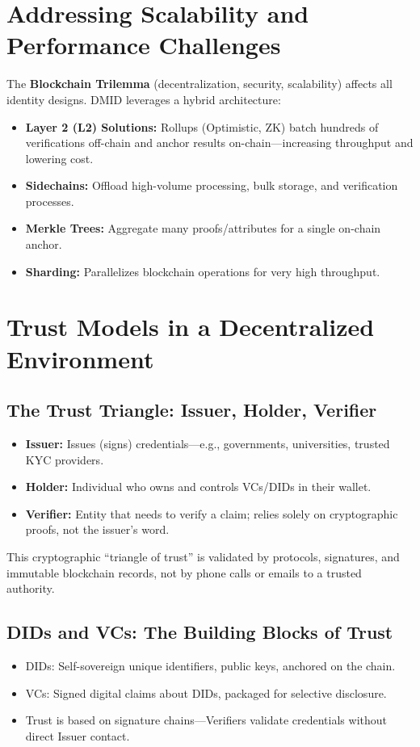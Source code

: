\section{Addressing Scalability and Performance Challenges}
The \textbf{Blockchain Trilemma} (decentralization, security, scalability) affects all identity designs. DMID leverages a hybrid architecture:
\begin{itemize}
    \item \textbf{Layer 2 (L2) Solutions:} Rollups (Optimistic, ZK) batch hundreds of verifications off-chain and anchor results on-chain—increasing throughput and lowering cost.
    \item \textbf{Sidechains:} Offload high-volume processing, bulk storage, and verification processes.
    \item \textbf{Merkle Trees:} Aggregate many proofs/attributes for a single on-chain anchor.
    \item \textbf{Sharding:} Parallelizes blockchain operations for very high throughput.
\end{itemize}

\section{Trust Models in a Decentralized Environment}

\subsection{The Trust Triangle: Issuer, Holder, Verifier}
\begin{itemize}
    \item \textbf{Issuer:} Issues (signs) credentials—e.g., governments, universities, trusted KYC providers.
    \item \textbf{Holder:} Individual who owns and controls VCs/DIDs in their wallet.
    \item \textbf{Verifier:} Entity that needs to verify a claim; relies solely on cryptographic proofs, not the issuer’s word.
\end{itemize}
This cryptographic ``triangle of trust'' is validated by protocols, signatures, and immutable blockchain records, not by phone calls or emails to a trusted authority.

\subsection{DIDs and VCs: The Building Blocks of Trust}
\begin{itemize}
    \item DIDs: Self-sovereign unique identifiers, public keys, anchored on the chain.
    \item VCs: Signed digital claims about DIDs, packaged for selective disclosure.
    \item Trust is based on signature chains—Verifiers validate credentials without direct Issuer contact.
\end{itemize}

